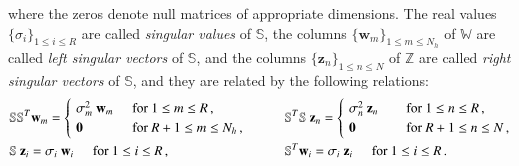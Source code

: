 \documentclass{elsarticle}
\numberwithin{equation}{section}
\theoremstyle{theorem}
\theoremstyle{definition}
\theoremstyle{remark}
\theoremstyle{proposition}
\numberwithin{figure}{section}
\begin{document}
		where the zeros denote null matrices of appropriate dimensions. The real values $\big\lbrace \sigma_i \big\rbrace_{1 \leq i \leq R}$ are called \emph{singular values} of $\mathbb{S}$, the columns $\big\lbrace \mathbf{w}_m \big\rbrace_{1 \leq m \leq N_h}$ of $\mathbb{W}$ are called \emph{left singular vectors} of $\mathbb{S}$, and the columns $\big\lbrace \mathbf{z}_n \big\rbrace_{1 \leq n \leq N}$ of $\mathbb{Z}$ are called \emph{right singular vectors} of $\mathbb{S}$, and they are related by the following relations:
		\begin{equation}
			\label{eq:svd-relationships}
			\begin{aligned}
				& \mathbb{S} \mathbb{S}^T \mathbf{w}_m = 
				\begin{cases}
					& \hspace*{-0.3cm} \sigma_m^2 ~ \mathbf{w}_m \hspace*{0.5cm} \text{for $1 \leq m \leq R$} \, , \\
					& \hspace*{-0.3cm} \mathrlap{\mathbf{0}}\hphantom{\sigma_m^2 ~ \mathbf{w}_m} \hspace*{0.5cm} \text{for $R+1 \leq m \leq {N_h}$} \, ,
				\end{cases}
				\qquad
				&& \mathbb{S}^T \mathbb{S} ~ \mathbf{z}_n =
				\begin{cases}
					& \hspace*{-0.3cm} \sigma_n^2 ~ \mathbf{z}_n \hspace*{0.74cm} \text{for $1 \leq n \leq R$} \, , \\
					& \hspace*{-0.3cm} \mathrlap{\mathbf{0}}\hphantom{\sigma_n^2 ~ \mathbf{z}_n} \hspace*{0.74cm} \text{for $R+1 \leq n \leq N$} \, ,
				\end{cases} \\
				& \mathbb{S} ~ \mathbf{z}_i = \sigma_i ~ \mathbf{w}_i \hspace*{0.5cm} \text{for $1 \leq i \leq R$} \, , 
				&& \mathbb{S}^T \mathbf{w}_i = \sigma_i ~ \mathbf{z}_i \hspace*{0.5cm} \text{for $1 \leq i \leq R$} \, .
			\end{aligned}
		\end{equation}
		
\end{document}
